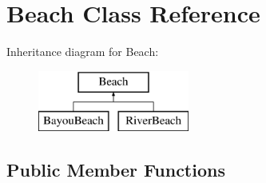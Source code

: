 \hypertarget{class_beach}{}\section{Beach Class Reference}
\label{class_beach}
Inheritance diagram for Beach\+:\begin{figure}[H]
\begin{center}
\leavevmode
\includegraphics[height=2.000000cm]{class_beach}
\end{center}
\end{figure}
\subsection*{Public Member Functions}
